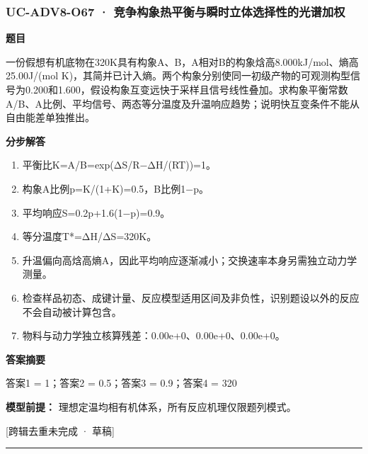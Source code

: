 \documentclass[UTF8,11pt,a4paper]{ctexart}
\begin{document}
\subsubsection*{UC-ADV8-O67 · 竞争构象热平衡与瞬时立体选择性的光谱加权}
\noindent\textbf{题目}\par
一份假想有机底物在320K具有构象A、B，A相对B的构象焓高8.000kJ/mol、熵高25.00J/(mol K)，其简并已计入熵。两个构象分别使同一初级产物的可观测构型信号为0.200和1.600，假设构象互变远快于采样且信号线性叠加。求构象平衡常数A/B、A比例、平均信号、两态等分温度及升温响应趋势；说明快互变条件不能从自由能差单独推出。\par
\medskip\noindent\textbf{分步解答}
\begin{enumerate}
\item 平衡比K=A/B=exp(ΔS/R−ΔH/(RT))=1。
\item 构象A比例p=K/(1+K)=0.5，B比例1−p。
\item 平均响应S=0.2p+1.6(1−p)=0.9。
\item 等分温度T*=ΔH/ΔS=320K。
\item 升温偏向高焓高熵A，因此平均响应逐渐减小；交换速率本身另需独立动力学测量。
\item 检查样品初态、成键计量、反应模型适用区间及非负性，识别题设以外的反应不会自动被计算包含。
\item 物料与动力学独立核算残差：0.00e+0、0.00e+0、0.00e+0。
\end{enumerate}
\noindent\textbf{答案摘要}\par
答案1 = 1；答案2 = 0.5；答案3 = 0.9；答案4 = 320\par
\noindent\textbf{模型前提：}
理想定温均相有机体系，所有反应机理仅限题列模式。\par
\noindent\textcolor{red!65!black}{[跨辑去重未完成 · 草稿]} \par
\medskip\hrule\medskip
{}
\end{document}
